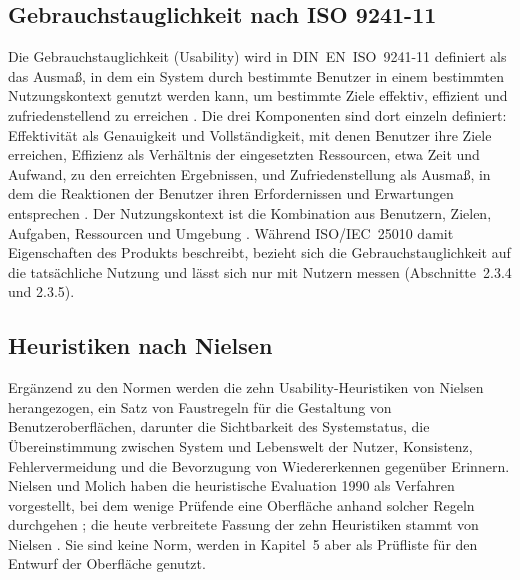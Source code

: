 \documentclass[12pt,a4paper]{scrreprt}
\begin{document}
\subsection{Gebrauchstauglichkeit nach ISO 9241-11}
Die Gebrauchstauglichkeit (Usability) wird in DIN~EN~ISO~9241-11 definiert als das Ausmaß, in dem ein System durch bestimmte Benutzer in einem bestimmten Nutzungskontext genutzt werden kann, um bestimmte Ziele effektiv, effizient und zufriedenstellend zu erreichen \cite[Abschn.~3.1.1]{iso9241}. Die drei Komponenten sind dort einzeln definiert: Effektivität als Genauigkeit und Vollständigkeit, mit denen Benutzer ihre Ziele erreichen, Effizienz als Verhältnis der eingesetzten Ressourcen, etwa Zeit und Aufwand, zu den erreichten Ergebnissen, und Zufriedenstellung als Ausmaß, in dem die Reaktionen der Benutzer ihren Erfordernissen und Erwartungen entsprechen \cite[Abschn.~3.1.12 bis 3.1.14]{iso9241}. Der Nutzungskontext ist die Kombination aus Benutzern, Zielen, Aufgaben, Ressourcen und Umgebung \cite[Abschn.~3.1.15]{iso9241}. Während ISO/IEC~25010 damit Eigenschaften des Produkts beschreibt, bezieht sich die Gebrauchstauglichkeit auf die tatsächliche Nutzung und lässt sich nur mit Nutzern messen (Abschnitte~2.3.4 und 2.3.5).

\subsection{Heuristiken nach Nielsen}
Ergänzend zu den Normen werden die zehn Usability-Heuristiken von Nielsen herangezogen, ein Satz von Faustregeln für die Gestaltung von Benutzeroberflächen, darunter die Sichtbarkeit des Systemstatus, die Übereinstimmung zwischen System und Lebenswelt der Nutzer, Konsistenz, Fehlervermeidung und die Bevorzugung von Wiedererkennen gegenüber Erinnern. Nielsen und Molich haben die heuristische Evaluation 1990 als Verfahren vorgestellt, bei dem wenige Prüfende eine Oberfläche anhand solcher Regeln durchgehen \cite{nielsenmolich1990}; die heute verbreitete Fassung der zehn Heuristiken stammt von Nielsen \cite{nielsen1994}. Sie sind keine Norm, werden in Kapitel~5 aber als Prüfliste für den Entwurf der Oberfläche genutzt.
\end{document}
